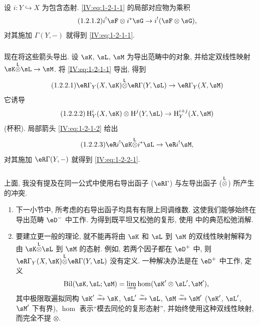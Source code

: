 设 $i:Y\hookrightarrow X$ 为包含态射. \eqref{IV:eq:1-2-1-1} 的局部对应物为乘积
\begin{equation*}\tag{1.2.1.2}\label{IV:eq:1-2-1-2}
  i^!\sF\otimes i^*\sG \to i^!(\sF\otimes\sG) \text{,}
\end{equation*}
对其施加 $\Gamma(Y,-)$ 就得到 \eqref{IV:eq:1-2-1-1}.

\subsubsection{}\label{IV:1-2-2}

现在将这些箭头导出. 设 $\sK$, $\sL$, $\sM$ 为导出范畴中的对象,
并给定双线性映射 $\sK\lotimes\sL\to\sM$. 将 \eqref{IV:eq:1-2-1-1} 导出, 得到
\begin{equation*}\tag{1.2.2.1}\label{IV:eq:1-2-2-1}
  \eR\Gamma_Y(X,\sK) \lotimes \eR\Gamma(Y,\sL) \to \eR\Gamma_Y(X,\sM)
\end{equation*}
它诱导
\begin{equation*}\tag{1.2.2.2}\label{IV:eq:1-2-2-2}
  \h_Y^i(X,\sK)\otimes \h^j(Y,\sL) \to \h_Y^{i+j}(X,\sM)
\end{equation*}
(杯积). 局部箭头 \eqref{IV:eq:1-2-1-2} 给出
\begin{equation*}\tag{1.2.2.3}\label{IV:eq:1-2-2-3}
  \eR i^! \sK\lotimes i^*\sL \to \eR i^!\sM \text{,}
\end{equation*}
对其施加 $\eR\Gamma(Y,-)$ 就得到 \eqref{IV:eq:1-2-2-1}.

\subsubsection{}\label{IV:1-2-3}

上面, 我没有提及在同一公式中使用右导出函子 ($\eR\Gamma$) 与左导出函子 (${\overset{\mathsf{L}}{\otimes}}$) 所产生的冲突.
\begin{enumerate}[\indent a)]
  \item 下一小节中, 所考虑的右导出函子均具有有限上同调维数.
    这使我们能够始终在导出范畴 $\eD^-$ 中工作.
    为得到既平坦又松弛的复形, 使用 \cite[XVII]{sga4} 中的典范松弛消解.
  \item 要建立更一般的理论, 就不能再将由 $\sK$ 和 $\sL$ 到 $\sM$ 的双线性映射解释为由
    $\sK\lotimes\sL$ 到 $\sM$ 的态射.
    例如, 若两个因子都在 $\eD^+$ 中, 则
    $\eR\Gamma_Y(X,\sK)\lotimes\eR\Gamma(Y,\sL)$ 没有定义.
    一种解决办法是在 $\eD^+$ 中工作, 定义
    \[
      \operatorname{Bil}(\sK,\sL;\sM) = \varinjlim \hom(\sK'\otimes\sL',\sM') \text{,}
    \]
    其中极限取遍拟同构 $\sK'\iso \sK$, $\sL'\iso \sL$, $\sM\iso \sM'$
    ($\sK'$, $\sL'$, $\sM'$ 下有界), $\hom$ 表示“模去同伦的复形态射”,
    并始终使用这种双线性映射, 而完全不提 $\otimes$.
\end{enumerate}

